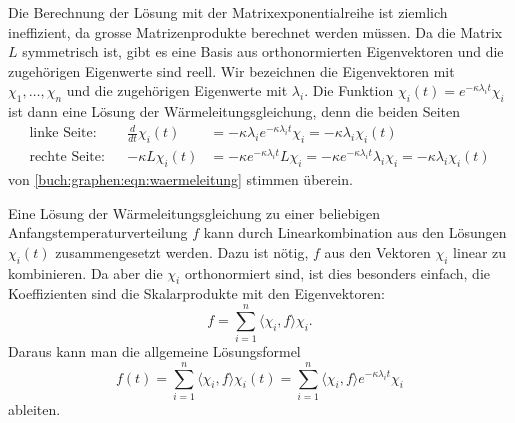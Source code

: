 Die Berechnung der Lösung mit der Matrixexponentialreihe ist ziemlich
ineffizient, da grosse Matrizenprodukte berechnet werden müssen.
Da die Matrix $L$ symmetrisch ist, gibt es eine Basis aus 
orthonormierten Eigenvektoren und die zugehörigen Eigenwerte sind reell.
Wir bezeichnen die Eigenvektoren mit $\chi_1,\dots,\chi_n$  und die
zugehörigen Eigenwerte mit $\lambda_i$.
Die Funktion $\chi_i(t)= e^{-\kappa\lambda_it}\chi_i$ ist dann eine Lösung
der Wärmeleitungsgleichung, denn die beiden Seiten
\begin{equation}
\begin{aligned}
\text{linke Seite:}&&
\frac{d}{dt}\chi_i(t)
&=
-\kappa\lambda_ie^{-\kappa\lambda_it}\chi_i
=
-\kappa\lambda_i \chi_i(t)
\\
\text{rechte Seite:}&&
-\kappa L\chi_i(t)
&=
-\kappa e^{-\kappa\lambda_it} L\chi_i
=
-\kappa e^{-\kappa\lambda_it} \lambda_i \chi_i
=
-\kappa \lambda_i \chi_i(t)
\end{aligned}
\end{equation}
von \eqref{buch:graphen:eqn:waermeleitung} stimmen überein.

Eine Lösung der Wärmeleitungsgleichung zu einer beliebigen
Anfangstemperaturverteilung $f$ kann durch Linearkombination aus 
den Lösungen $\chi_i(t)$ zusammengesetzt werden.
Dazu ist nötig, $f$ aus den Vektoren $\chi_i$ linear zu kombinieren.
Da aber die $\chi_i$ orthonormiert sind, ist dies besonders einfach,
die Koeffizienten sind die Skalarprodukte mit den Eigenvektoren:
\[
f=\sum_{i=1}^n \langle \chi_i,f\rangle \chi_i.
\]
Daraus kann man die allgemeine Lösungsformel
\begin{equation}
f(t)
=
\sum_{i=1}^n \langle \chi_i,f\rangle \chi_i(t)
=
\sum_{i=1}^n \langle \chi_i,f\rangle e^{-\kappa\lambda_i t}\chi_i
\label{buch:graphen:eqn:eigloesung}
\end{equation}
ableiten.

